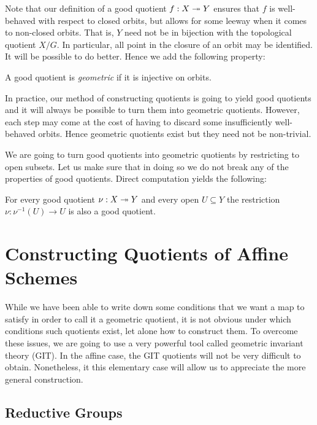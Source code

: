\documentclass[12pt]{ociamthesis}  %
\begin{document}
Note that our definition of a good quotient $f : X\twoheadrightarrow Y$
ensures that $f$ is well-behaved with respect to closed orbits, but
allows for some leeway when it comes to non-closed orbits. That is,
$Y$ need not be in bijection with the topological quotient $X/G$. In particular,
all point in the closure of an orbit may be identified. It will be
possible to do better. Hence we add the following property:

\begin{definition}\label{def:geometric_quotient}
  A good quotient is \emph{geometric} if it is injective on orbits.
\end{definition}

In practice, our method of constructing quotients is going to yield
good quotients and it will always be possible to turn them into geometric
quotients. However, each step may come at the cost of having to
discard some insufficiently well-behaved orbits. Hence geometric quotients
exist but they need not be non-trivial.

We are going to turn good quotients into geometric quotients by
restricting to open subsets. Let us make sure that in doing so we
do not break any of the properties of good quotients. Direct computation
yields the following:

\begin{lemma}\label{lem:restrictions_of_good_quotients}
  For every good quotient $\nu:X\twoheadrightarrow Y$ and every open $U\subseteq Y$
  the restriction $\nu : \nu^{-1}(U)\to U$ is
  also a good quotient.
\end{lemma}

\section{Constructing Quotients of Affine Schemes}

While we have been able to write down some conditions that we want
a map to satisfy in order to call it a geometric quotient, it is not
obvious under which conditions such quotients exist, let alone how to
construct them. To overcome these issues, we are going to
use a very powerful tool called geometric invariant theory (GIT).
In the affine case, the GIT quotients will not be very difficult
to obtain. Nonetheless, it this elementary case will
allow us to appreciate the more general construction.

\subsection{Reductive Groups}
\end{document}
